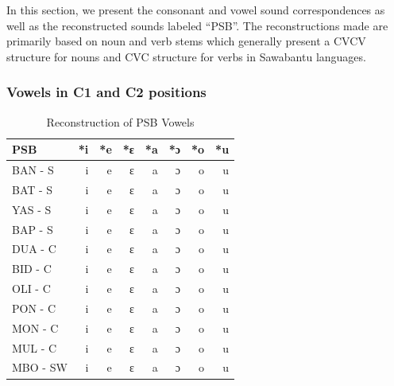 \documentclass[output=paper,colorlinks,citecolor=brown
]{langscibook}
\begin{document}
In this section, we present the consonant and vowel sound correspondences as well as the reconstructed sounds labeled “PSB”. The reconstructions made are primarily based on noun and verb stems which generally present a CVCV structure for nouns and CVC structure for verbs in Sawabantu languages.

\subsubsection{Vowels in C1 and C2 positions} \label{sect:browngrollemundrule:vowels}

\begin{table}[b]
\caption{Reconstruction of PSB Vowels}
\label{tab:grollemundbrownrule:psbvowels}
 \begin{tabular}{lrrrrrrr}
  \lsptoprule
 \textbf{PSB} & \textbf{*i} & \textbf{*e} & \textbf{*ɛ} & \textbf{*a} & \textbf{*ɔ} & \textbf{*o} & \textbf{*u} \\
   \midrule
BAN - S      & i           & e           & ɛ           & a           & ɔ           & o           & u           \\
BAT - S      & i           & e           & ɛ           & a           & ɔ           & o           & u           \\
YAS - S      & i           & e           & ɛ           & a           & ɔ           & o           & u           \\
BAP - S      & i           & e           & ɛ           & a           & ɔ           & o           & u           \\
DUA - C      & i           & e           & ɛ           & a           & ɔ           & o           & u           \\
BID - C      & i           & e           & ɛ           & a           & ɔ           & o           & u           \\
OLI - C      & i           & e           & ɛ           & a           & ɔ           & o           & u           \\
PON - C      & i           & e           & ɛ           & a           & ɔ           & o           & u           \\
MON - C      & i           & e           & ɛ           & a           & ɔ           & o           & u           \\
MUL - C      & i           & e           & ɛ           & a           & ɔ           & o           & u           \\
MBO - SW     & i           & e           & ɛ           & a           & ɔ           & o           & u           \\

\end{tabular}
\end{table}
\end{document}
